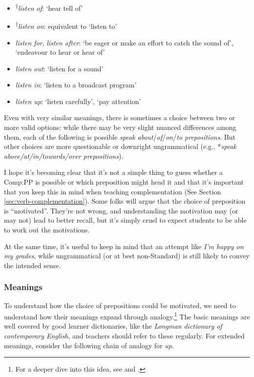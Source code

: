 \begin{itemize}
    \item \textsuperscript{†}\textit{listen of}: `hear tell of'
    \item \textsuperscript{†}\textit{listen on}: equivalent to `listen to'
    \item \textit{listen for}, \textit{listen after}: `be eager or make an effort to catch the sound of', `endeavour to hear or hear of'
    \item \textit{listen out}: `listen for a sound'
    \item \textit{listen in}: `listen to a broadcast program'
    \item \textit{listen up}: `listen carefully', `pay attention'
\end{itemize}

Even with very similar meanings, there is sometimes a choice between two or more valid options: while there may be very slight nuanced differences among them, each of the following is possible \textit{speak about}/\textit{of}/\textit{on}/\textit{to prepositions}. But other choices are more questionable or downright ungrammatical (e.g., *\textit{speak above/at/in/towards/over prepositions}).

I hope it's becoming clear that it's not a simple thing to guess whether a Comp:PP is possible or which preposition might head it and that it's important that you keep this in mind when teaching complementation (See Section \ref{sec:verb-complementation}). Some folks will argue that the choice of preposition is ``motivated''. They're not wrong, and understanding the motivation may (or may not) lead to better recall, but it's simply cruel to expect students to be able to work out the motivations.

At the same time, it's useful to keep in mind that an attempt like \textit{I'm happy on my grades}, while ungrammatical (or at best non-Standard) is still likely to convey the intended sense.

\subsubsection*{Meanings} \label{sec:preposition-meanings}

To understand how the choice of prepositions could be motivated, we need to understand how their meanings expand through analogy.\footnote{For a deeper dive into this idea, see \citet{lakoff1980} and \citet{tyler2003}.} The basic meanings are well covered by good learner dictionaries, like the \textit{Longman dictionary of contemporary English}, and teachers should refer to these regularly. For extended meanings, consider the following chain of analogy for \textit{up}.

